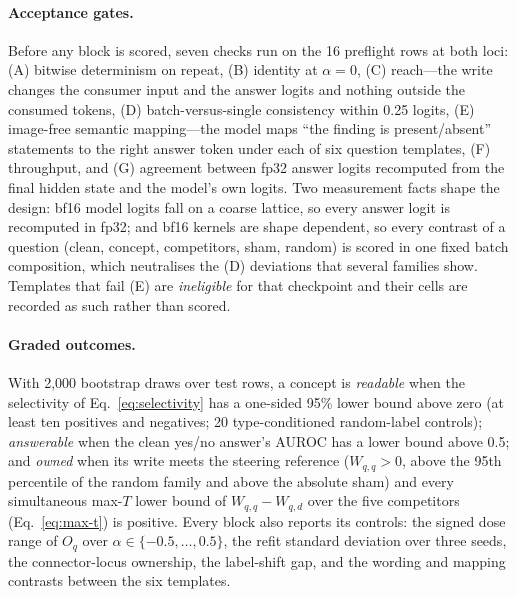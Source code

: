 \paragraph{Acceptance gates.}
Before any block is scored, seven checks run on the 16 preflight rows at both loci: (A) bitwise determinism on repeat, (B) identity at $\alpha=0$, (C) reach---the write changes the consumer input and the answer logits and nothing outside the consumed tokens, (D) batch-versus-single consistency within 0.25 logits, (E) image-free semantic mapping---the model maps ``the finding is present/absent'' statements to the right answer token under each of six question templates, (F) throughput, and (G) agreement between fp32 answer logits recomputed from the final hidden state and the model's own logits. Two measurement facts shape the design: bf16 model logits fall on a coarse lattice, so every answer logit is recomputed in fp32; and bf16 kernels are shape dependent, so every contrast of a question (clean, concept, competitors, sham, random) is scored in one fixed batch composition, which neutralises the (D) deviations that several families show. Templates that fail (E) are \emph{ineligible} for that checkpoint and their cells are recorded as such rather than scored.

\paragraph{Graded outcomes.}
With 2,000 bootstrap draws over test rows, a concept is \emph{readable} when the selectivity of Eq.~\ref{eq:selectivity} has a one-sided 95\% lower bound above zero (at least ten positives and negatives; 20 type-conditioned random-label controls); \emph{answerable} when the clean yes/no answer's AUROC has a lower bound above 0.5; and \emph{owned} when its write meets the steering reference ($W_{q,q}>0$, above the 95th percentile of the random family and above the absolute sham) and every simultaneous max-$T$ lower bound of $W_{q,q}-W_{q,d}$ over the five competitors (Eq.~\ref{eq:max-t}) is positive. Every block also reports its controls: the signed dose range of $O_q$ over $\alpha\in\{-0.5,\dots,0.5\}$, the refit standard deviation over three seeds, the connector-locus ownership, the label-shift gap, and the wording and mapping contrasts between the six templates.
